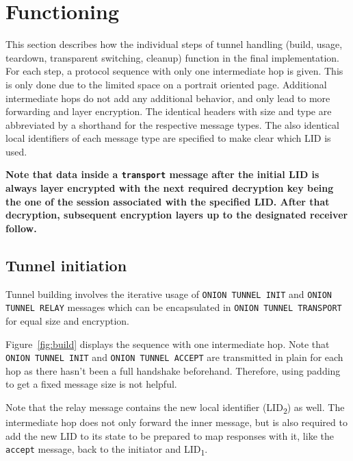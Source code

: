 \documentclass[paper=letter, fontsize=12pt]{article}
\begin{document}
\section{Functioning}
This section describes how the individual steps of tunnel handling (build, usage, teardown, transparent switching, cleanup) function in the final implementation. For each step, a protocol sequence with only one intermediate hop is given. This is only done due to the limited space on a portrait oriented page. Additional intermediate hops do not add any additional behavior, and only lead to more forwarding and layer encryption.
The identical headers with size and type are abbreviated by a shorthand for the respective message types. The also identical local identifiers of each message type are specified to make clear which LID is used. 

\textbf{Note that data inside a \texttt{transport} message after the initial LID is always layer encrypted with the next required decryption key being the one of the session associated with the specified LID. After that decryption, subsequent encryption layers up to the designated receiver follow.}

\subsection{Tunnel initiation}
\label{sec:function:build}
Tunnel building involves the iterative usage of \texttt{ONION TUNNEL INIT} and \texttt{ONION TUNNEL RELAY} messages which can be encapsulated in \texttt{ONION TUNNEL TRANSPORT} for equal size and encryption.

Figure~\ref{fig:build} displays the sequence with one intermediate hop. Note that \texttt{ONION TUNNEL INIT} and \texttt{ONION TUNNEL ACCEPT} are transmitted in plain for each hop as there hasn't been a full handshake beforehand. Therefore, using padding to get a fixed message size is not helpful.

Note that the relay message contains the new local identifier (LID\textsubscript{2}) as well. The intermediate hop does not only forward the inner message, but is also required to add the new LID to its state to be prepared to map responses with it, like the \texttt{accept} message, back to the initiator and LID\textsubscript{1}.
\end{document}
